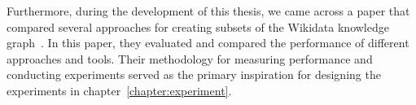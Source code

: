 Furthermore, during the development of this thesis, we came across a paper that compared several approaches for creating subsets of the Wikidata knowledge graph~\cite{wikidataTools}. In this paper, they evaluated and compared the performance of different approaches and tools. Their methodology for measuring performance and conducting experiments served as the primary inspiration for designing the experiments in chapter~\ref{chapter:experiment}.